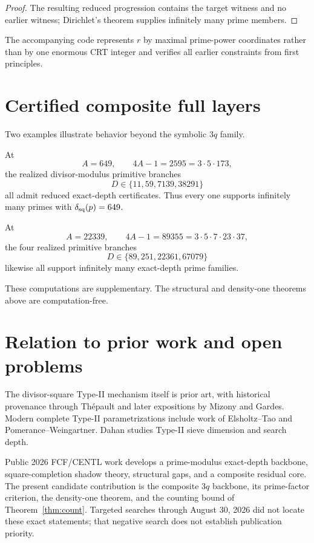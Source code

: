 \documentclass[11pt]{article}
\theoremstyle{definition}
\begin{document}
\begin{proof}
The resulting reduced progression contains the target witness and no earlier witness; Dirichlet's theorem supplies infinitely many prime members.
\end{proof}

The accompanying code represents $r$ by maximal prime-power coordinates rather than by one enormous CRT integer and verifies all earlier constraints from first principles.

\section{Certified composite full layers}
Two examples illustrate behavior beyond the symbolic $3q$ family.

At
\[
A=649,
\qquad
4A-1=2595=3\cdot5\cdot173,
\]
the realized divisor-modulus primitive branches
\[
D\in\{11,59,7139,38291\}
\]
all admit reduced exact-depth certificates.  Thus every one supports infinitely many primes with $\delta_{\rm sq}(p)=649$.

At
\[
A=22339,
\qquad
4A-1=89355=3\cdot5\cdot7\cdot23\cdot37,
\]
the four realized primitive branches
\[
D\in\{89,251,22361,67079\}
\]
likewise all support infinitely many exact-depth prime families.

These computations are supplementary.  The structural and density-one theorems above are computation-free.

\section{Relation to prior work and open problems}
The divisor-square Type-II mechanism itself is prior art, with historical provenance through Th\'epault and later expositions by Mizony and Gardes.  Modern complete Type-II parametrizations include work of Elsholtz--Tao and Pomerance--Weingartner.  Dahan studies Type-II sieve dimension and search depth.

Public 2026 FCF/CENTL work develops a prime-modulus exact-depth backbone, square-completion shadow theory, structural gaps, and a composite residual core.  The present candidate contribution is the composite $3q$ backbone, its prime-factor criterion, the density-one theorem, and the counting bound of Theorem~\ref{thm:count}.  Targeted searches through August 30, 2026 did not locate these exact statements; that negative search does not establish publication priority.
\end{document}

